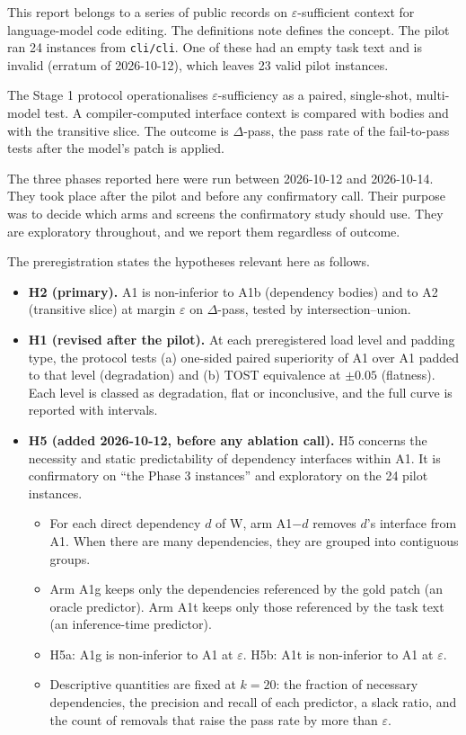 \documentclass[10pt]{article}
\newcommand{\eps}{\varepsilon}
\begin{document}
This report belongs to a series of public records on $\eps$-sufficient context for language-model code editing. The definitions note \cite{definitions} defines the concept. The pilot \cite{pilot} ran 24 instances from \texttt{cli/cli}. One of these had an empty task text and is invalid (erratum of 2026-10-12), which leaves 23 valid pilot instances.

The Stage 1 protocol \cite{stage1} operationalises $\eps$-sufficiency as a paired, single-shot, multi-model test. A compiler-computed interface context is compared with bodies and with the transitive slice. The outcome is $\Delta$-pass, the pass rate of the fail-to-pass tests after the model's patch is applied.

The three phases reported here were run between 2026-10-12 and 2026-10-14. They took place after the pilot and before any confirmatory call. Their purpose was to decide which arms and screens the confirmatory study should use. They are exploratory throughout, and we report them regardless of outcome.

The preregistration states the hypotheses relevant here as follows.

\begin{itemize}
\item \textbf{H2 (primary).} A1 is non-inferior to A1b (dependency bodies) and to A2 (transitive slice) at margin $\eps$ on $\Delta$-pass, tested by intersection--union.
\item \textbf{H1 (revised after the pilot).} At each preregistered load level and padding type, the protocol tests (a) one-sided paired superiority of A1 over A1 padded to that level (degradation) and (b) TOST equivalence at $\pm 0.05$ (flatness). Each level is classed as degradation, flat or inconclusive, and the full curve is reported with intervals.
\item \textbf{H5 (added 2026-10-12, before any ablation call).} H5 concerns the necessity and static predictability of dependency interfaces within A1. It is confirmatory on ``the Phase 3 instances'' and exploratory on the 24 pilot instances.
  \begin{itemize}
  \item For each direct dependency $d$ of W, arm A1$-d$ removes $d$'s interface from A1. When there are many dependencies, they are grouped into contiguous groups.
  \item Arm A1g keeps only the dependencies referenced by the gold patch (an oracle predictor). Arm A1t keeps only those referenced by the task text (an inference-time predictor).
  \item H5a: A1g is non-inferior to A1 at $\eps$. H5b: A1t is non-inferior to A1 at $\eps$.
  \item Descriptive quantities are fixed at $k=20$: the fraction of necessary dependencies, the precision and recall of each predictor, a slack ratio, and the count of removals that raise the pass rate by more than $\eps$.
  \end{itemize}
\end{itemize}
\end{document}
